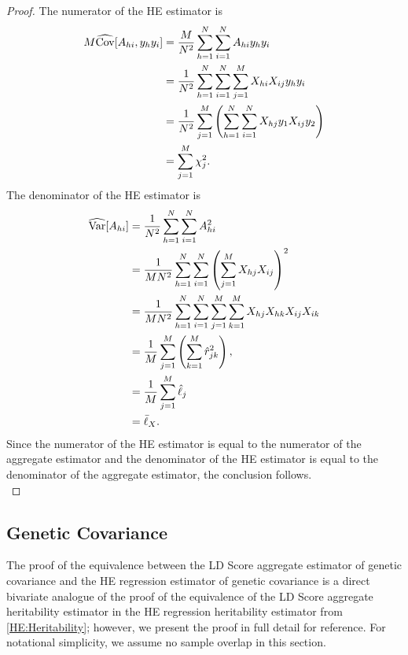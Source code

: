 \documentclass[11pt]{article}
\numberwithin{equation}{section}
\numberwithin{definition}{section}
\numberwithin{thm}{section}
\numberwithin{lemma}{section}
\numberwithin{prop}{section}
\numberwithin{cor}{section}
\numberwithin{hyp}{section}
\begin{document}
\begin{proof} The numerator of the HE estimator is 
\begin{align*}
	M\widehat{\mathrm{Cov}}[A_{hi}, y_hy_i] 
&= 
	\frac{M}{N^2}
		\sum_{h=1}^{N} 
			\sum_{i=1}^{N} 
				A_{hi}y_hy_i	\\
&= 
	\frac{1}{N^2} 
		\sum_{h = 1}^{N} 
			\sum_{i = 1}^{N} 
				\sum_{j = 1}^M 
					X_{hi}X_{ij}y_hy_i	 \\
&= 
	\frac{1}{N^2}\sum_{j = 1}^M \left( 
		\sum_{h = 1}^{N} 
			\sum_{i = 1}^{N} X_{hj}
				y_1 X_{ij}y_2 
	\right) \\
&= 
	\sum_{j = 1}^M \chi^2_j.
\end{align*}	
The denominator of the HE estimator is 
\begin{align*}
	\widehat{\mathrm{Var}}[A_{hi}]
&= 
	\frac{1}{N^2} 
		\sum_{h = 1}^{N}
			\sum_{i = 1}^{N} 
				A_{hi}^2\\
&= 
	\frac{1}{MN^2} 
		\sum_{h = 1}^{N} 
			\sum_{i = 1}^{N} \left( 
				\sum_{j = 1}^M 
					X_{hj}X_{ij} 
			\right)^2\\
&= 
	\frac{1}{MN^2} 
		\sum_{h = 1}^{N}	
			\sum_{i = 1}^{N}
				\sum_{j = 1}^M 
					\sum_{k=1}^M 
						X_{hj}X_{hk}X_{ij}X_{ik} \\	
&= 
	\frac{1}{M} 
		\sum_{j = 1}^M \left( 
			\sum_{k=1}^M \hat{r}_{jk}^2
		\right),\\
&= 
	\frac{1}{M} 
		\sum_{j=1}^M 
			\hat{\ell}_j \\
&= 
	\bar{\ell}_{X}.
\end{align*}
Since the numerator of the HE estimator is equal to the numerator of the aggregate estimator 
and the denominator of the HE estimator is equal to the denominator of the aggregate estimator,
the conclusion follows.  \\
\end{proof}

\subsection{Genetic Covariance}\label{HE:Genetic Covariance}

The proof of the equivalence between the LD Score aggregate estimator of genetic covariance and the HE regression estimator 
of genetic covariance is a direct bivariate analogue of the proof of the equivalence of the LD Score aggregate heritability 
estimator in the HE regression heritability estimator from \ref{HE:Heritability}; however, we present the proof in full detail for
reference. For notational simplicity, we assume no sample overlap in this section. 
\end{document}
